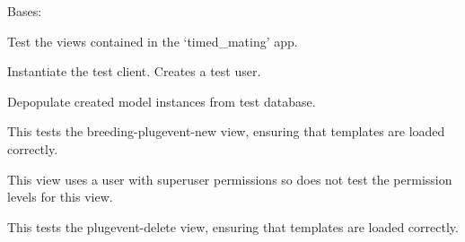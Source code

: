 \documentclass[letterpaper,10pt,english]{sphinxmanual}
\begin{document}
\begin{fulllineitems}
\label{api:mousedb.timed_mating.tests.Timed_MatingViewTests}
Bases: 

Test the views contained in the `timed\_mating' app.


\begin{fulllineitems}
\label{api:mousedb.timed_mating.tests.Timed_MatingViewTests.setUp}
Instantiate the test client.  Creates a test user.

\end{fulllineitems}



\begin{fulllineitems}
\label{api:mousedb.timed_mating.tests.Timed_MatingViewTests.tearDown}
Depopulate created model instances from test database.

\end{fulllineitems}



\begin{fulllineitems}
\label{api:mousedb.timed_mating.tests.Timed_MatingViewTests.test_breeding_plugevent_new}
This tests the breeding-plugevent-new view, ensuring that templates are loaded correctly.

This view uses a user with superuser permissions so does not test the permission levels for this view.

\end{fulllineitems}



\begin{fulllineitems}
\label{api:mousedb.timed_mating.tests.Timed_MatingViewTests.test_plugevent_delete}
This tests the plugevent-delete view, ensuring that templates are loaded correctly.


\end{fulllineitems}
\end{fulllineitems}
\end{document}
